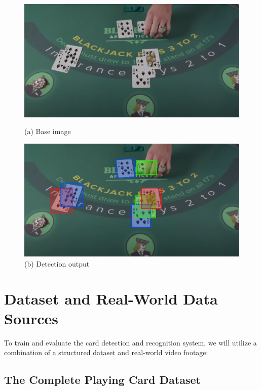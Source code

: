 \documentclass{article}
\begin{document}
\begin{figure}[htbp]
    \centering
    \begin{minipage}{0.45\textwidth}
        \centering
        \includegraphics[width=\linewidth]{./assets/example_default.png}
        \caption{(a) Base image}
    \end{minipage}
    \hfill
    \begin{minipage}{0.45\textwidth}
        \centering
        \includegraphics[width=\linewidth]{./assets/example_detected.png}
        \caption{(b) Detection output}
    \end{minipage}
    \label{fig:fig2}
\end{figure}

\section*{Dataset and Real-World Data Sources}

To train and evaluate the card detection and recognition system, we will utilize a combination of a structured dataset and real-world video footage:

\subsection*{The Complete Playing Card Dataset}
\end{document}
